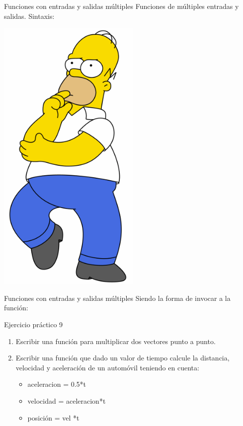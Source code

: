 \documentclass{bredelebeamer}
\begin{document}
\begin{frame}{Funciones con entradas y salidas múltiples}
Funciones de múltiples entradas y salidas. Sintaxis:\\

\begin{center}
\includegraphics[scale=0.15]{images/img40.png}
\end{center}
\end{frame}

\begin{frame}{Funciones con entradas y salidas múltiples}
Siendo la forma de invocar a la función:

\end{frame}

\begin{frame}{Ejercicio práctico 9}
\begin{enumerate}
\item Escribir una función para multiplicar dos vectores punto a punto.
\item Escribir una función que dado un valor de tiempo calcule la distancia, velocidad y aceleración de un automóvil teniendo en cuenta:
\begin{itemize}
\item aceleracion = 0.5*t
\item velocidad = aceleracion*t
\item posición = vel *t
\end{itemize}
\end{enumerate}
\end{frame}
\end{document}

